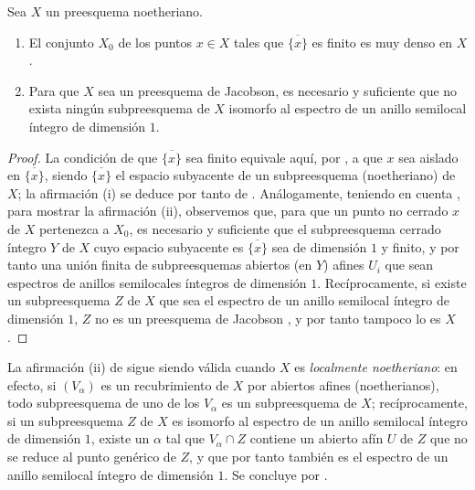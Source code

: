 \begin{proposition}[10.5.5]
\label{IV.10.5.5}
Sea $X$ un preesquema noetheriano.
\begin{enumerate}[label=\textup{(\roman*)}]
  \item El conjunto $X_0$ de los puntos $x\in X$ tales que $\overline{\{x\}}$ es finito es muy denso en $X$.
  \item Para que $X$ sea un preesquema de Jacobson, es necesario y suficiente que no exista ningún subpreesquema de $X$ isomorfo al espectro de un anillo semilocal íntegro de dimensión $1$.
\end{enumerate}
\end{proposition}

\begin{proof}
La condición de que $\overline{\{x\}}$ sea finito equivale aquí, por , a que $x$ sea aislado en $\overline{\{x\}}$, siendo $\overline{\{x\}}$ el espacio subyacente de un subpreesquema (noetheriano) de $X$; la afirmación (i) se deduce por tanto de .
Análogamente, teniendo en cuenta , para mostrar la afirmación (ii), observemos que, para que un punto no cerrado $x$ de $X$ pertenezca a $X_0$, es necesario y suficiente que el subpreesquema cerrado íntegro $Y$ de $X$ cuyo espacio subyacente es $\overline{\{x\}}$ sea de dimensión $1$ y finito, y por tanto una unión finita de subpreesquemas abiertos (en $Y$) afines $U_i$ que sean espectros de anillos semilocales íntegros de dimensión $1$.
Recíprocamente, si existe un subpreesquema $Z$ de $X$ que sea el espectro de un anillo semilocal íntegro de dimensión $1$, $Z$ no es un preesquema de Jacobson , y por tanto tampoco lo es $X$ .
\end{proof}


\begin{remark}[10.5.6]
\label{IV.10.5.6}
La afirmación (ii) de  sigue siendo válida cuando $X$ es \emph{localmente noetheriano}: en efecto, si $(V_\alpha)$ es un recubrimiento de $X$ por abiertos afines (noetherianos), todo subpreesquema de uno de los $V_\alpha$ es un subpreesquema de $X$; recíprocamente, si un subpreesquema $Z$ de $X$ es isomorfo al espectro de un anillo semilocal íntegro de dimensión $1$, existe un $\alpha$ tal que $V_\alpha\cap Z$ contiene un abierto afín $U$ de $Z$ que no se reduce al punto genérico de $Z$, y que por tanto también es el espectro de un anillo semilocal íntegro de dimensión $1$.
Se concluye por .
\end{remark}

